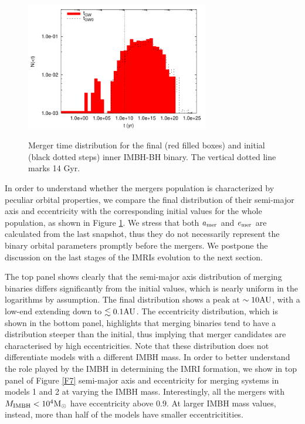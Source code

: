 \documentclass[twocolumn]{aastex62}
\newcommand{\Ms}{{\rm M}_\odot}
\newcommand{\au}{{\rm AU}}
\newcommand{\ibh}{{\rm IMBH}}
\begin{document}
\begin{figure}
\centering
\includegraphics[width=8cm]{merger_time_histo}\\
\caption{Merger time distribution for the final (red filled boxes) and initial (black dotted steps) inner IMBH-BH binary. The vertical dotted line marks 14 Gyr.}
\label{F6}
\end{figure}

In order to understand whether the mergers population is characterized by peculiar orbital properties, we compare the final distribution of their semi-major axis and eccentricity with the corresponding initial values for the whole population, as shown in Figure \ref{F6}. 
We stress that both $a_{\rm mer}$ and $e_{\rm mer}$ are calculated from the last snapshot, thus they do not necessarily represent the binary orbital parameters promptly before the mergers. We postpone the discussion on the last stages of the IMRIs evolution to the next section.

The top panel shows clearly that the semi-major axis distribution of merging binaries differs significantly from the initial values, which is nearly uniform in the logarithms by assumption. The final distribution shows a peak at $\sim 10\au$, with a low-end extending down to $\lesssim 0.1 \au$. The eccentricity distribution, which is shown in the bottom panel, highlights that merging binaries tend to have a distribution steeper than the initial, thus implying that merger candidates are characterised by high eccentricities. Note that these distribution does not differentiate models with a different IMBH mass. In order to better understand the role played by the IMBH in determining the IMRI formation, we show in top panel of Figure \ref{F7} semi-major axis and eccentricity for merging systems in models 1 and 2 at varying the IMBH mass. Interestingly, all the mergers with $M_{\ibh} < 10^4\Ms$ have eccentricity above $0.9$. At larger IMBH mass values, instead, more than half of the models have smaller eccentricitities. 
\end{document}
